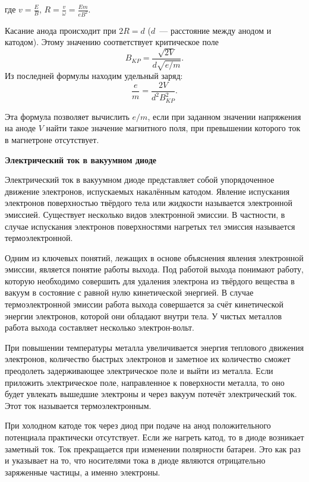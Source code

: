где $ v=\frac{E}{B}$, $R=\frac{v}{\omega}=\frac{Em}{eB^2}$.

Касание анода происходит при $2R=d$ ($d$~--- расстояние между анодом и катодом). Этому значению соответствует
критическое поле
\begin{equation}
B_{KP}=\frac{\sqrt{2V}}{d\sqrt{e/m}}.
\label{3FlatMagnetronR}
\end{equation}
Из последней формулы находим удельный заряд:
\begin{equation}
\frac{e}{m}=\frac{2V}{d^2B_{KP}^2}.
\label{3FlatMagnetronEkM}
\end{equation}

Эта формула позволяет вычислить $e/m$, если при заданном значении напряжения на аноде $V$ найти такое значение
магнитного поля, при превышении которого ток в магнетроне отсутствует.

{\bf \Large Электрический ток в вакуумном диоде}

Электрический ток в вакуумном диоде представляет собой упорядоченное движение электронов, испускаемых накалённым
катодом. Явление испускания электронов поверхностью твёрдого тела или жидкости называется {\textsf{электронной эмиссией}}.
Существует несколько видов электронной эмиссии. В частности, в случае испускания электронов поверхностями нагретых тел эмиссия называется {\textsf{термоэлектронной}}.

Одним из ключевых понятий, лежащих в основе объяснения явления электронной эмиссии, является понятие {\textsf{работы выхода}}. Под работой выхода понимают работу, которую необходимо совершить для удаления электрона из твёрдого вещества в вакуум в состояние с равной нулю кинетической энергией. В случае термоэлектронной эмиссии работа выхода совершается за счёт кинетической энергии электронов, которой они обладают внутри тела. У чистых металлов работа выхода составляет несколько электрон-вольт.

При повышении температуры металла увеличивается энергия теплового движения электронов, количество быстрых электронов и заметное их количество сможет преодолеть задерживающее электрическое поле и выйти из металла. Если приложить
электрическое поле, направленное к поверхности металла, то оно будет увлекать вышедшие электроны и через вакуум потечёт электрический ток. Этот ток называется {\textsf{термоэлектронным}}.

При холодном катоде ток через диод при подаче на анод положительного потенциала практически отсутствует. Если же нагреть катод, то в диоде возникает заметный ток. Ток прекращается при изменении полярности батареи. Это как раз и указывает на то, что носителями тока в диоде являются отрицательно заряженные частицы, а именно электроны.

